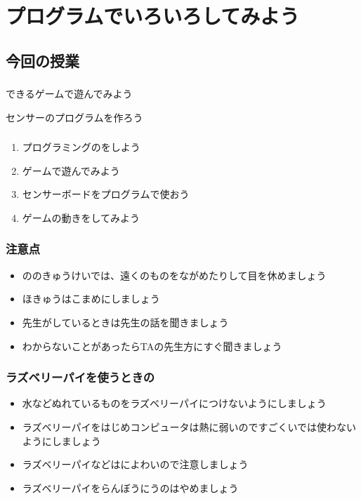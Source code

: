 \documentclass[text04.tex]{subfiles}
\begin{document}
\chapter{プログラムでいろいろしてみよう}
\section{今回の授業}
\subsection{}
できるゲームで遊んでみよう

センサーのプログラムを作ろう

\subsection{}
\begin{enumerate}
    \item プログラミングのをしよう
    \item {}ゲームで遊んでみよう
    \item センサーボードをプログラムで使おう
    \item ゲームの動きをしてみよう
\end{enumerate}

\subsection{注意点}
\begin{itemize}
    \item {}ののきゅうけいでは、遠くのものをながめたりして目を休めましょう
    \item {}ほきゅうはこまめにしましょう
    \item 先生がしているときは先生の話を聞きましょう
    \item わからないことがあったらTAの先生方にすぐ聞きましょう
\end{itemize}

\subsection{ラズベリーパイを使うときの}
\begin{itemize}
  \item 水などぬれているものをラズベリーパイにつけないようにしましょう
  \item ラズベリーパイをはじめコンピュータは熱に弱いのですごくいでは使わないようにしましょう
  \item ラズベリーパイなどはによわいので注意しましょう
  \item ラズベリーパイをらんぼうにうのはやめましょう
\end{itemize}
\clearpage
\end{document}
